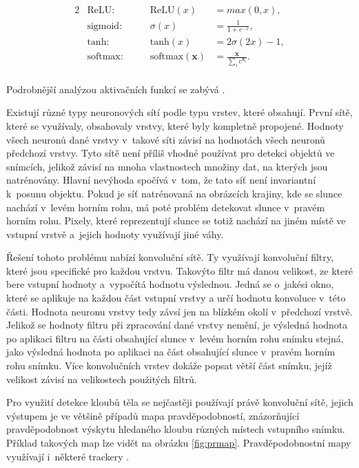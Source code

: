 \begin{alignat*}{2}
    &\text{ReLU:} \qquad &\text{ReLU}(x) &= max(0,x), \\
    &\text{sigmoid:} \qquad &\sigma(x) &= \frac{1}{1+e^{-x}}, \\
    &\text{tanh:} \qquad &\text{tanh}(x) &= 2\sigma(2x) - 1, \\
    &\text{softmax:} \qquad &\text{softmax}(\mathbf{x}) &= \frac{\mathbf{x}}{\sum_i{e^{\mathbf{x}_i}}}. \\
\end{alignat*}

Podrobnější analýzou aktivačních funkcí se zabývá \citet{activations}.

Existují různé typy neuronových sítí podle typu vrstev, které obsahují. První sítě, které se využívaly, obsahovaly vrstvy, které byly kompletně propojené. Hodnoty všech neuronů dané vrstvy v~takové síti závisí na hodnotách všech neuronů předchozí vrstvy. Tyto sítě není příliš vhodné používat pro detekci objektů ve snímcích, jelikož závisí na mnoha vlastnostech množiny dat, na kterých jsou natrénovány. Hlavní nevýhoda spočívá v~tom, že tato síť není invariantní k~posunu objektu. Pokud je síť natrénovaná na obrázcích krajiny, kde se slunce nachází v~levém horním rohu, má poté problém detekovat slunce v~pravém horním rohu. Pixely, které reprezentují slunce se totiž nachází na jiném místě ve vstupní vrstvě a~jejich hodnoty využívají jiné váhy.

Řešení tohoto problému nabízí konvoluční sítě. Ty využívají konvoluční filtry, které jsou specifické pro každou vrstvu. Takovýto filtr má danou velikost, ze které bere vstupní hodnoty a~vypočítá hodnotu výslednou. Jedná se o~jakési okno, které se aplikuje na každou část vstupní vrstvy a určí hodnotu konvoluce v~této části. Hodnota neuronu vrstvy tedy závsí jen na blízkém okolí v~předchozí vrstvě. Jelikož se hodnoty filtru při zpracování dané vrstvy nemění, je výsledná hodnota po aplikaci filtru na části obsahující slunce v~levém horním rohu snímku stejná, jako výsledná hodnota po aplikaci na část obsahující slunce v~pravém horním rohu snímku. Více konvolučních vrstev dokáže popsat větší část snímku, jejíž velikost závisí na velikostech použitých filtrů.

Pro využití detekce kloubů těla se nejčastěji používají právě konvoluční sítě, jejich výstupem je ve většině případů mapa pravděpodobností, znázorňující pravděpodobnost výskytu hledaného kloubu různých místech vstupního snímku. Příklad takových map lze vidět na obrázku \ref{fig:prmap}. Pravděpodobnostní mapy využívají i~některé trackery \citep{DCFwCaSR}.

